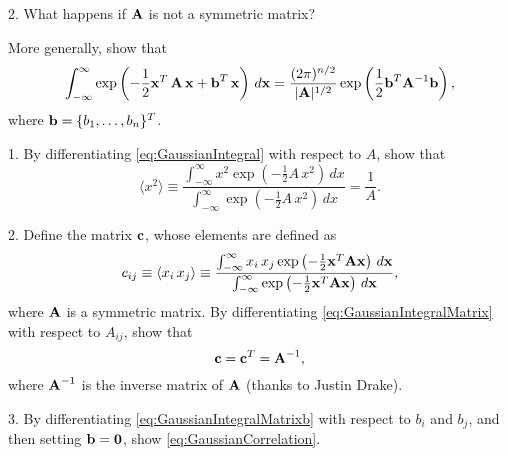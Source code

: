 \documentclass{book}
\begin{document}
2. What happens if $\boldsymbol{\mathbf{A}}$ is not a symmetric matrix?







More generally, show that
\begin{equation}
  \int_{-\infty}^{\infty}
  \exp\left(
    -\frac{1}{2} \boldsymbol{\mathbf{x}}^T \, \boldsymbol{\mathbf{A}} \, \boldsymbol{\mathbf{x}}
    + \boldsymbol{\mathbf{b}}^T \, \boldsymbol{\mathbf{x}}
  \right) \, d\boldsymbol{\mathbf{x}}
  =
  \frac{ (2\pi)^{n/2} }
  { |\boldsymbol{\mathbf{A}}|^{1/2} }
  \exp\left( \frac{1}{2} \boldsymbol{\mathbf{b}}^T \boldsymbol{\mathbf{A}}^{-1} \boldsymbol{\mathbf{b}} \right),
  \label{eq:GaussianIntegralMatrixb}
\end{equation}
%
where $\boldsymbol{\mathbf{b}} = \{b_1, \dots, b_n\}^T$.
%






1. By differentiating \eqref{eq:GaussianIntegral} with respect to $A$, show that
\begin{equation}
  \langle x^2 \rangle
\equiv \frac {
  \int_{-\infty}^{\infty}
    x^2 \exp\left( - \frac{1}{2} A\,x^2 \right) \, dx
} {
  \int_{-\infty}^{\infty}
  \exp\left( - \frac{1}{2} A\,x^2 \right) \, dx
}
=
\frac{1}{A}.
\end{equation}

2.
Define the matrix $\boldsymbol{\mathbf{c}}$, whose elements are defined as
\begin{equation*}
c_{ij}
\equiv \langle x_i \, x_j \rangle
\equiv \frac {
  \int_{-\infty}^{\infty}
    x_i \, x_j \exp\left( -\frac{1}{2} \boldsymbol{\mathbf{x}}^T \boldsymbol{\mathbf{A}} \boldsymbol{\mathbf{x}} \right) \, d\boldsymbol{\mathbf{x}}
} {
\int_{-\infty}^{\infty}
  \exp\left( -\frac{1}{2} \boldsymbol{\mathbf{x}}^T \boldsymbol{\mathbf{A}} \boldsymbol{\mathbf{x}} \right) \, d\boldsymbol{\mathbf{x}}
},
\end{equation*}
%
where $\boldsymbol{\mathbf{A}}$ is a symmetric matrix.
%
By differentiating \eqref{eq:GaussianIntegralMatrix} with respect to $A_{ij}$, show that
%
\begin{equation}
  \boldsymbol{\mathbf{c}} = \boldsymbol{\mathbf{c}}^T = \boldsymbol{\mathbf{A}}^{-1},
  \label{eq:GaussianCorrelation}
\end{equation}
%
where
$\boldsymbol{\mathbf{A}}^{-1}$ is the inverse matrix of $\boldsymbol{\mathbf{A}}$
(thanks to Justin Drake).


3. By differentiating \eqref{eq:GaussianIntegralMatrixb} with respect to $b_i$ and $b_j$,
and then setting $\boldsymbol{\mathbf{b}} = \boldsymbol{\mathbf{0}}$, show \eqref{eq:GaussianCorrelation}.
\end{document}
